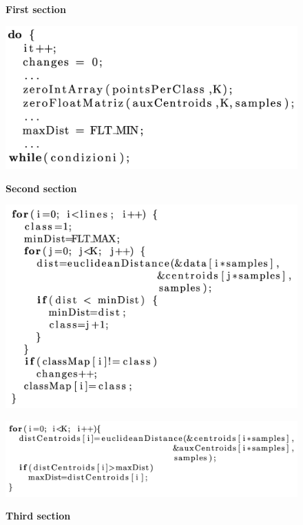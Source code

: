 \documentclass{article}
\begin{document}
  \begin{figure}[ht]
    \centering
    \begin{minipage}{0.4\textwidth}
        \centering
        \caption{\textbf{First section}}
        \includegraphics[width=\linewidth]{./First-section.png}
        \label{f_section}
    \end{minipage}
    \begin{minipage}{0.5\textwidth}
        \centering
        \caption{\textbf{Second section}}
        \includegraphics[width=\linewidth]{./Second-section.png}
        \label{s_section}
    \end{minipage}
    \begin{minipage}{0.65\textwidth}
        \centering
        \caption{\textbf{Third section}}
        \includegraphics[width=\linewidth]{./Third-section.png}
        \label{t_section}
    \end{minipage}
  \end{figure}
\end{document}
